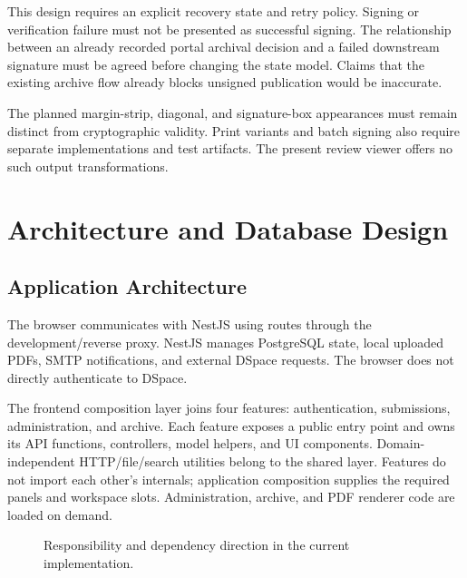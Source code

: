 \documentclass[11pt,a4paper]{report}
\newcommand{\code}[1]{{\small\texttt{\detokenize{#1}}}}
\begin{document}
This design requires an explicit recovery state and retry policy. Signing or verification failure must not be presented as successful signing. The relationship between an already recorded portal archival decision and a failed downstream signature must be agreed before changing the state model. Claims that the existing archive flow already blocks unsigned publication would be inaccurate.

The planned margin-strip, diagonal, and signature-box appearances must remain distinct from cryptographic validity. Print variants and batch signing also require separate implementations and test artifacts. The present review viewer offers no such output transformations.

\section{Architecture and Database Design}
\subsection{Application Architecture}
The browser communicates with NestJS using \code{/api} routes through the development/reverse proxy. NestJS manages PostgreSQL state, local uploaded PDFs, SMTP notifications, and external DSpace requests. The browser does not directly authenticate to DSpace.

The frontend composition layer joins four features: authentication, submissions, administration, and archive. Each feature exposes a public entry point and owns its API functions, controllers, model helpers, and UI components. Domain-independent HTTP/file/search utilities belong to the shared layer. Features do not import each other's internals; application composition supplies the required panels and workspace slots. Administration, archive, and PDF renderer code are loaded on demand.

\begin{figure}[htbp]
\centering
{}
\caption{Responsibility and dependency direction in the current implementation.}
\label{fig:architecture}
\end{figure}
\end{document}
